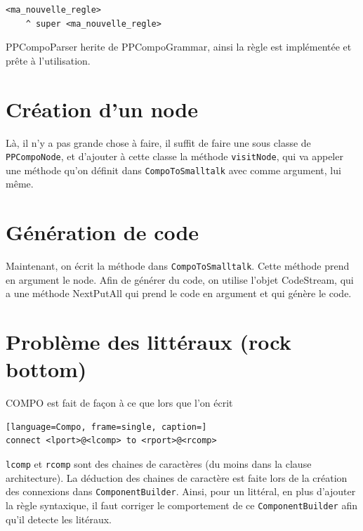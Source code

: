 \documentclass[11pt,a4paper,openany,oneside]{book}
\begin{document}
\begin{appendices}
\begin{lstlisting}[language=Compo, frame=single, caption=Création d'une régle]
<ma_nouvelle_regle>
	^ super <ma_nouvelle_regle>
\end{lstlisting}
	
PPCompoParser herite de PPCompoGrammar, ainsi la règle est implémentée et prête à l'utilisation.

\section*{Création d'un node}
Là, il n'y a pas grande chose à faire, il suffit de faire une sous classe de \texttt{PPCompoNode}, et d'ajouter à cette classe la méthode \texttt{visitNode}, 
qui va appeler une méthode qu'on définit dans \texttt{CompoToSmalltalk} avec comme argument, lui même.

\section*{Génération de code}
Maintenant, on écrit la méthode dans \texttt{CompoToSmalltalk}. Cette méthode prend en argument le node.
Afin de générer du code, on utilise l'objet CodeStream, qui a une méthode NextPutAll qui prend le code en argument et qui génère le code.

\section*{Problème des littéraux (rock bottom)}
COMPO est fait de façon à ce que lors que l'on écrit

\begin{lstlisting}[language=Compo, frame=single, caption=]
connect <lport>@<lcomp> to <rport>@<rcomp>
\end{lstlisting}

\texttt{lcomp} et \texttt{rcomp} sont des
chaines de caractères (du moins dans la clause architecture). La déduction des chaines de caractère est faite lors de la création des connexions dans \texttt{ComponentBuilder}. Ainsi, pour un littéral, en plus d'ajouter la règle syntaxique, il faut
corriger le comportement de ce \texttt{ComponentBuilder} afin qu'il detecte les litéraux.


\end{appendices}
\glsaddall
\end{document}

